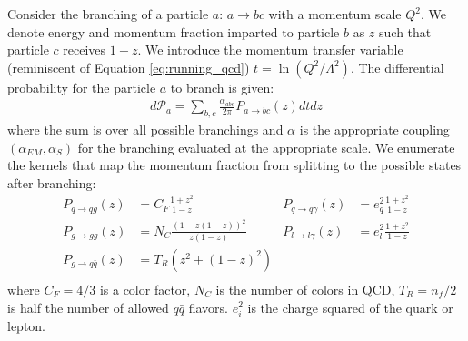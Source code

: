 Consider the branching of a particle $a$:  $a\rightarrow bc$ with a 
momentum scale $Q^2$. We denote energy and momentum fraction imparted to particle $b$ as $z$
 such that particle $c$ receives $1-z$. We introduce the momentum
transfer variable (reminiscent of Equation \ref{eq:running_qcd}) $t = \ln (Q^2 / \Lambda^2)$. The
differential probability for the particle $a$ to branch is given:
\begin{align*}
d\mathcal{P}_a = \sum_{b,c} \frac{\alpha_{abc}}{2\pi} P_{a \rightarrow bc}(z) dt dz 
\end{align*}
where the sum is over all possible branchings and $\alpha$ is the appropriate 
coupling $(\alpha_{EM},\alpha_{S})$  for the branching evaluated at the appropriate scale. We enumerate the kernels that map the momentum fraction from splitting
 to the possible states after branching:
\begin{align*}
P_{q\rightarrow qg} (z) &= C_F\frac{1+z^2}{1-z}   &P_{q\rightarrow q\gamma} (z) &= e_q^2\frac{1+z^2}{1-z}\\
P_{g\rightarrow gg} (z) &= N_C\frac{(1-z(1-z))^2}{z(1-z)} &P_{l\rightarrow l\gamma} (z) &= e_l^2\frac{1+z^2}{1-z} \\ 
P_{g\rightarrow q\bar{q}} (z) &= T_R (z^2 + (1-z)^2)\\
\end{align*}
where $C_F=4/3$ is a color factor, $N_C$ is the number of colors in QCD, $T_R = n_f / 2$ is half the number 
of allowed $q\bar{q}$ flavors. $e_i^2$ is the charge squared of the quark or lepton. 

